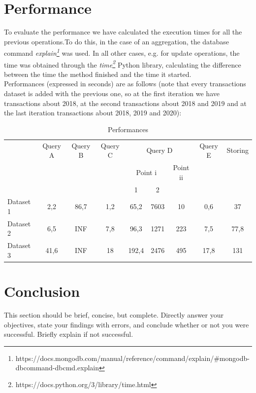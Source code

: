 \documentclass[runningheads]{llncs}
\begin{document}
\section{Performance}

To evaluate the performance we have calculated the execution times for all the previous operations.To do this, in the case of an aggregation, the database command \emph{explain\footnote{https://docs.mongodb.com/manual/reference/command/explain/\#mongodb-dbcommand-dbcmd.explain}} was used. In all other cases, e.g. for update operations, the time was obtained through the \emph{time\footnote{https://docs.python.org/3/library/time.html}} Python library, calculating the difference between the time the method finished and the time it started.\\
Performances (expressed in seconds) are as follows (note that every transactions dataset is added with the previous one, so at the first iteration we have transactions about 2018, at the second transactions about 2018 and 2019 and at the last iteration transactions about 2018, 2019 and 2020):


\begin{table}[!htb]
\centering
\begin{tabular}{l|c|c|c|ccc|c|l|}
\cline{2-9}
 &
  Query A &
  Query B &
  Query C &
  \multicolumn{3}{c|}{Query D} &
  Query E &
  Storing \\ \cline{2-9} 
\multirow{2}{*}{} &
  \multicolumn{1}{l|}{} &
  \multicolumn{1}{l|}{} &
   &
  \multicolumn{2}{c|}{Point i} &
  Point ii &
  \multicolumn{1}{l|}{} &
   \\ \cline{5-7}
 & \multicolumn{1}{l|}{} & \multicolumn{1}{l|}{} &  & \multicolumn{1}{c|}{1} & \multicolumn{1}{c|}{2} & \multicolumn{1}{l|}{} & \multicolumn{1}{l|}{} &  \\ \hline
\multicolumn{1}{|l|}{Dataset 1} &
  2,2 &
  86,7 &
  1,2 &
  \multicolumn{1}{c|}{65,2} &
  \multicolumn{1}{c|}{7603} &
  10 &
  0,6 &
  \multicolumn{1}{c|}{37} \\ \hline
\multicolumn{1}{|l|}{Dataset 2} &
  6,5 &
  INF &
  7,8 &
  \multicolumn{1}{c|}{96,3} &
  \multicolumn{1}{c|}{1271} &
  223 &
  7,5 &
  \multicolumn{1}{c|}{77,8} \\ \hline
\multicolumn{1}{|l|}{Dataset 3} &
  41,6 &
  INF &
  18 &
  \multicolumn{1}{c|}{192,4} &
  \multicolumn{1}{c|}{2476} &
  495 &
  17,8 &
  \multicolumn{1}{c|}{131} \\ \hline
\end{tabular}
\caption{Performances}
\label{tab:my-table}
\end{table}

\section{Conclusion}
This section should be brief, concise, but complete. Directly answer your objectives, state your findings with errors, and conclude whether or not you were successful. Briefly explain if not successful.
\end{document}
